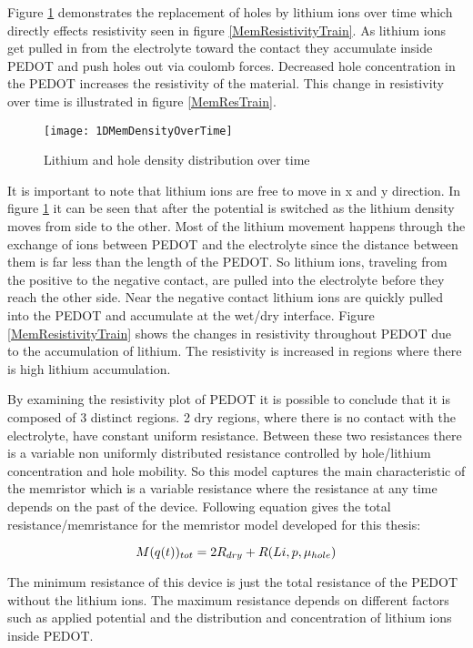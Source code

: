 {Figure \ref{MempLi} demonstrates the replacement of holes by lithium ions over time which directly effects resistivity seen in figure \ref{MemResistivityTrain}.  As lithium ions get pulled in from the electrolyte toward the contact they accumulate inside PEDOT and push holes out via coulomb forces. Decreased hole concentration in the PEDOT increases the resistivity of the material. This change in resistivity over time is illustrated in figure \ref{MemResTrain}.

\begin{figure}[!htp]
\centering
\texttt{[image: 1DMemDensityOverTime]}
\caption{Lithium and hole density distribution over time} 
\label{MempLi}
\end{figure}

It is important to note that lithium ions are free to move in x and y direction. In figure \ref{MempLi} it can be seen that after the potential is switched as the lithium density moves from  side to the other. Most of the lithium movement happens through the exchange of ions between PEDOT and the electrolyte since the distance between them is far less than the length of the PEDOT. So lithium ions, traveling from the positive to the negative contact, are pulled into the electrolyte before they reach the other side. Near the negative contact lithium ions are quickly pulled into the PEDOT and accumulate at the wet/dry interface. Figure \ref{MemResistivityTrain} shows the changes in resistivity throughout PEDOT due to the accumulation of lithium. The resistivity is increased in regions where there is high lithium accumulation. 

By examining the resistivity plot of PEDOT it is possible to conclude that it is composed of 3 distinct regions. 2 dry regions, where there is no contact with the electrolyte, have constant uniform resistance. Between these two resistances there is a variable non uniformly distributed resistance controlled by hole/lithium concentration and hole mobility. So this model captures the main characteristic of the memristor which is a variable resistance where the resistance at any time depends on the past of the device. Following equation gives the total resistance/memristance for the memristor model developed for this thesis:

\begin{equation}
\centering
M(q(t))_{tot}=2R_{dry}+R(Li,p,\mu_{hole})
\end{equation}

The minimum resistance of this device is just the total resistance of the PEDOT without the lithium ions. The maximum resistance depends on different factors such as applied potential and the distribution and concentration of lithium ions inside PEDOT.

}
